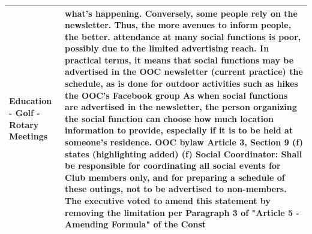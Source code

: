 \documentclass{article}
\begin{document}
\begin{table}
{\begin{tabular}{p{} | p{}}
\midrule
Education - Golf - Rotary Meetings & what's happening. Conversely, some people rely on the newsletter. Thus, the more avenues to inform people, the better.
attendance at many social functions is poor, possibly due to the limited advertising reach.
In practical terms, it means that social functions may be advertised in
the OOC newsletter (current practice)
the schedule, as is done for outdoor activities such as hikes
the OOC's Facebook group
As when social functions are advertised in the newsletter, the person organizing the social function can choose how much location information to provide, especially if it is to be held at someone's residence.
OOC bylaw Article 3, Section 9 (f) states (highlighting added)
(f) Social Coordinator: Shall be responsible for coordinating all social events for Club members only, and for preparing a schedule of these outings, not to be advertised to non-members.
The executive voted to amend this statement by removing the limitation per Paragraph 3 of "Article 5 - Amending Formula" of the Const \\ %
\bottomrule
\end{tabular}
}
\label{tab:embed-samples-1}
\end{table}
\end{document}
